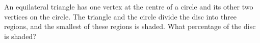 An equilateral triangle has one vertex at the centre of a circle and its other two vertices on the circle. The triangle and the circle divide the disc into three regions, and the smallest of these regions is shaded. What percentage of the disc is shaded?
